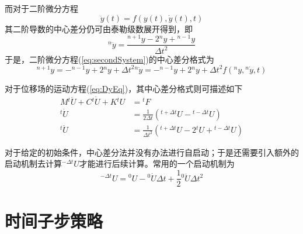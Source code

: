 而对于二阶微分方程
\begin{equation}
\ddot{y}(t)=f(y(t),\dot{y}(t),t)\label{eq:secondSystem}
\end{equation}
其二阶导数的中心差分仍可由泰勒级数展开得到，即
\begin{equation}
{^n\!\ddot{y}}=\frac{{^{n+1}\!y}-2{^n\!y}+{^{n-1}\!y}}{\Delta t^2}
\end{equation}
于是，二阶微分方程(\ref{eq:secondSystem})的中心差分格式为
\begin{equation}
{^{n+1}\!y}=-{^{n-1}\!y}+2{^n\!y}+\Delta t^2{^n\!\ddot{y}}=-{^{n-1}\!y}+2{^n\!y}+\Delta t^2f({^n\!y},{^n\!\dot{y}},t)
\end{equation}

对于位移场的运动方程(\ref{eq:DyEq})，其中心差分格式则可描述如下
\begin{align}
M{^{t}\!\ddot{U}}+C{^{t}\!\dot{U}}+K{^{t}\!U}&={^{t}\!F}\\
{^t\!\dot{U}}&=\frac{1}{2\Delta t}({^{t+\Delta t}\!{U}}-{^{t-\Delta t}\!{U}})\\
{^t\!\ddot{U}}&=\frac{1}{\Delta t^2}({^{t+\Delta t}\!{U}}-2{^t\!{U}}+{^{t-\Delta t}\!{U}})
\end{align}

对于给定的初始条件，中心差分法并没有办法进行自启动；于是还需要引入额外的启动机制去计算${^{-\Delta t}\!U}$才能进行后续计算。常用的一个启动机制\cite{张雄2007}为
\begin{equation}
{^{-\Delta t}\!U}={^0\!U}-{^0\!\dot{U}}\Delta t+\frac{1}{2}{^0\!\ddot{U}}\Delta t^2
\end{equation}

\section{时间子步策略}
